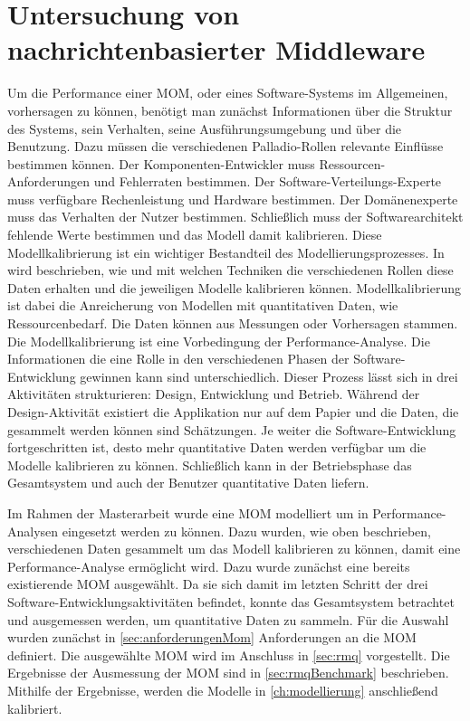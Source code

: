 

\chapter{Untersuchung von nachrichtenbasierter Middleware}
\label{ch:mom}
Um die Performance einer MOM, oder eines Software-Systems im Allgemeinen, vorhersagen zu können, benötigt man zunächst Informationen über die Struktur des Systems, sein Verhalten, seine Ausführungsumgebung und über die Benutzung. Dazu müssen die verschiedenen Palladio-Rollen relevante Einflüsse bestimmen können. Der Komponenten-Entwickler muss Ressourcen-Anforderungen und Fehlerraten bestimmen. Der Software-Verteilungs-Experte muss verfügbare Rechenleistung und Hardware bestimmen. Der Domänenexperte muss das Verhalten der Nutzer bestimmen. Schließlich muss der Softwarearchitekt fehlende Werte bestimmen und das Modell damit kalibrieren. Diese Modellkalibrierung ist ein wichtiger Bestandteil des Modellierungsprozesses. In \cite{palladio17} wird beschrieben, wie und mit welchen Techniken die verschiedenen Rollen diese Daten erhalten und die jeweiligen Modelle kalibrieren können. Modellkalibrierung ist dabei die Anreicherung von Modellen mit quantitativen Daten, wie Ressourcenbedarf. Die Daten können aus Messungen oder Vorhersagen stammen. Die Modellkalibrierung ist eine Vorbedingung der Performance-Analyse. Die Informationen die eine Rolle in den verschiedenen Phasen der Software-Entwicklung gewinnen kann sind unterschiedlich. Dieser Prozess lässt sich in drei Aktivitäten strukturieren: Design, Entwicklung und Betrieb. Während der Design-Aktivität existiert die Applikation nur auf dem Papier und die Daten, die gesammelt werden können sind Schätzungen. Je weiter die Software-Entwicklung fortgeschritten ist, desto mehr quantitative Daten werden verfügbar um die Modelle kalibrieren zu können. Schließlich kann in der Betriebsphase das Gesamtsystem und auch der Benutzer quantitative Daten liefern. 

Im Rahmen der Masterarbeit wurde eine MOM modelliert um in Performance-Analysen eingesetzt werden zu können. Dazu wurden, wie oben beschrieben, verschiedenen Daten gesammelt um das Modell kalibrieren zu können, damit eine Performance-Analyse ermöglicht wird. Dazu wurde zunächst eine bereits existierende MOM ausgewählt. Da sie sich damit im letzten Schritt der drei Software-Entwicklungsaktivitäten befindet, konnte das Gesamtsystem betrachtet und ausgemessen werden, um quantitative Daten zu sammeln. Für die Auswahl wurden zunächst in \autoref{sec:anforderungenMom} Anforderungen an die MOM definiert. Die ausgewählte MOM wird im Anschluss in \autoref{sec:rmq} vorgestellt. Die Ergebnisse der Ausmessung der MOM sind in \autoref{sec:rmqBenchmark} beschrieben. Mithilfe der Ergebnisse, werden die Modelle in \autoref{ch:modellierung} anschließend kalibriert.


